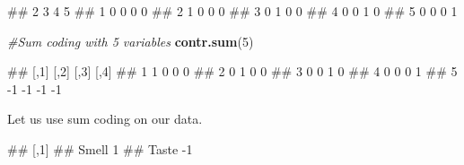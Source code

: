 \documentclass[
]{book}
\newenvironment{Shaded}{\begin{snugshade}}{\end{snugshade}}
\newcommand{\AttributeTok}[1]{\textcolor[rgb]{0.13,0.29,0.53}{#1}}
\newcommand{\CommentTok}[1]{\textcolor[rgb]{0.56,0.35,0.01}{\textit{#1}}}
\newcommand{\DecValTok}[1]{\textcolor[rgb]{0.00,0.00,0.81}{#1}}
\newcommand{\FunctionTok}[1]{\textcolor[rgb]{0.13,0.29,0.53}{\textbf{#1}}}
\newcommand{\NormalTok}[1]{#1}
\newcommand{\OtherTok}[1]{\textcolor[rgb]{0.56,0.35,0.01}{#1}}
\newcommand{\SpecialCharTok}[1]{\textcolor[rgb]{0.81,0.36,0.00}{\textbf{#1}}}
\begin{document}
\begin{Shaded}
\begin{Highlighting}[]
\NormalTok{\#\#   2 3 4 5}
\NormalTok{\#\# 1 0 0 0 0}
\NormalTok{\#\# 2 1 0 0 0}
\NormalTok{\#\# 3 0 1 0 0}
\NormalTok{\#\# 4 0 0 1 0}
\NormalTok{\#\# 5 0 0 0 1}
\end{Highlighting}
\end{Shaded}

\begin{Shaded}
\begin{Highlighting}[]
\CommentTok{\#Sum coding with 5 variables}
\FunctionTok{contr.sum}\NormalTok{(}\DecValTok{5}\NormalTok{)}
\end{Highlighting}
\end{Shaded}

\begin{Shaded}
\begin{Highlighting}[]
\NormalTok{\#\#   [,1] [,2] [,3] [,4]}
\NormalTok{\#\# 1    1    0    0    0}
\NormalTok{\#\# 2    0    1    0    0}
\NormalTok{\#\# 3    0    0    1    0}
\NormalTok{\#\# 4    0    0    0    1}
\NormalTok{\#\# 5   {-}1   {-}1   {-}1   {-}1}
\end{Highlighting}
\end{Shaded}

Let us use sum coding on our data.

\begin{Shaded}
\end{Shaded}

\begin{Shaded}
\begin{Highlighting}[]
\NormalTok{\#\#       [,1]}
\NormalTok{\#\# Smell    1}
\NormalTok{\#\# Taste   {-}1}
\end{Highlighting}
\end{Shaded}
\end{document}
